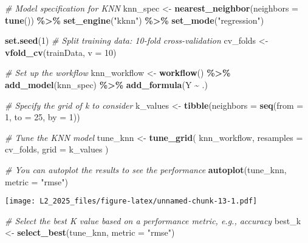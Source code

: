 \documentclass[
]{article}
\newenvironment{Shaded}{\begin{snugshade}}{\end{snugshade}}
\newcommand{\AttributeTok}[1]{\textcolor[rgb]{0.13,0.29,0.53}{#1}}
\newcommand{\CommentTok}[1]{\textcolor[rgb]{0.56,0.35,0.01}{\textit{#1}}}
\newcommand{\DecValTok}[1]{\textcolor[rgb]{0.00,0.00,0.81}{#1}}
\newcommand{\FunctionTok}[1]{\textcolor[rgb]{0.13,0.29,0.53}{\textbf{#1}}}
\newcommand{\NormalTok}[1]{#1}
\newcommand{\OtherTok}[1]{\textcolor[rgb]{0.56,0.35,0.01}{#1}}
\newcommand{\SpecialCharTok}[1]{\textcolor[rgb]{0.81,0.36,0.00}{\textbf{#1}}}
\newcommand{\StringTok}[1]{\textcolor[rgb]{0.31,0.60,0.02}{#1}}
\begin{document}
\begin{Shaded}
\begin{Highlighting}[]
\CommentTok{\# Model specification for KNN}
\NormalTok{knn\_spec }\OtherTok{\textless{}{-}} \FunctionTok{nearest\_neighbor}\NormalTok{(}\AttributeTok{neighbors =} \FunctionTok{tune}\NormalTok{()) }\SpecialCharTok{\%\textgreater{}\%}
  \FunctionTok{set\_engine}\NormalTok{(}\StringTok{"kknn"}\NormalTok{) }\SpecialCharTok{\%\textgreater{}\%}
  \FunctionTok{set\_mode}\NormalTok{(}\StringTok{"regression"}\NormalTok{)}

\FunctionTok{set.seed}\NormalTok{(}\DecValTok{1}\NormalTok{)}
\CommentTok{\# Split training data: 10{-}fold cross{-}validation}
\NormalTok{cv\_folds }\OtherTok{\textless{}{-}} \FunctionTok{vfold\_cv}\NormalTok{(trainData, }\AttributeTok{v =} \DecValTok{10}\NormalTok{)}

\CommentTok{\# Set up the workflow}
\NormalTok{knn\_workflow }\OtherTok{\textless{}{-}} \FunctionTok{workflow}\NormalTok{() }\SpecialCharTok{\%\textgreater{}\%}
  \FunctionTok{add\_model}\NormalTok{(knn\_spec) }\SpecialCharTok{\%\textgreater{}\%}
  \FunctionTok{add\_formula}\NormalTok{(Y }\SpecialCharTok{\textasciitilde{}}\NormalTok{ .)}

\CommentTok{\# Specify the grid of k to consider}
\NormalTok{k\_values }\OtherTok{\textless{}{-}} \FunctionTok{tibble}\NormalTok{(}\AttributeTok{neighbors =} \FunctionTok{seq}\NormalTok{(}\AttributeTok{from =} \DecValTok{1}\NormalTok{, }\AttributeTok{to =} \DecValTok{25}\NormalTok{, }\AttributeTok{by =} \DecValTok{1}\NormalTok{))}

\CommentTok{\# Tune the KNN model}
\NormalTok{tune\_knn }\OtherTok{\textless{}{-}} \FunctionTok{tune\_grid}\NormalTok{(}
\NormalTok{  knn\_workflow,}
  \AttributeTok{resamples =}\NormalTok{ cv\_folds,}
  \AttributeTok{grid =}\NormalTok{ k\_values}
\NormalTok{)}

\CommentTok{\# You can autoplot the results to see the performance}
\FunctionTok{autoplot}\NormalTok{(tune\_knn, }\AttributeTok{metric =} \StringTok{"rmse"}\NormalTok{)}
\end{Highlighting}
\end{Shaded}

\texttt{[image: L2\_2025\_files/figure-latex/unnamed-chunk-13-1.pdf]}

\begin{Shaded}
\begin{Highlighting}[]
\CommentTok{\# Select the best K value based on a performance metric, e.g., accuracy}
\NormalTok{best\_k }\OtherTok{\textless{}{-}} \FunctionTok{select\_best}\NormalTok{(tune\_knn, }\AttributeTok{metric =} \StringTok{"rmse"}\NormalTok{)}
\end{Highlighting}
\end{Shaded}
\end{document}
